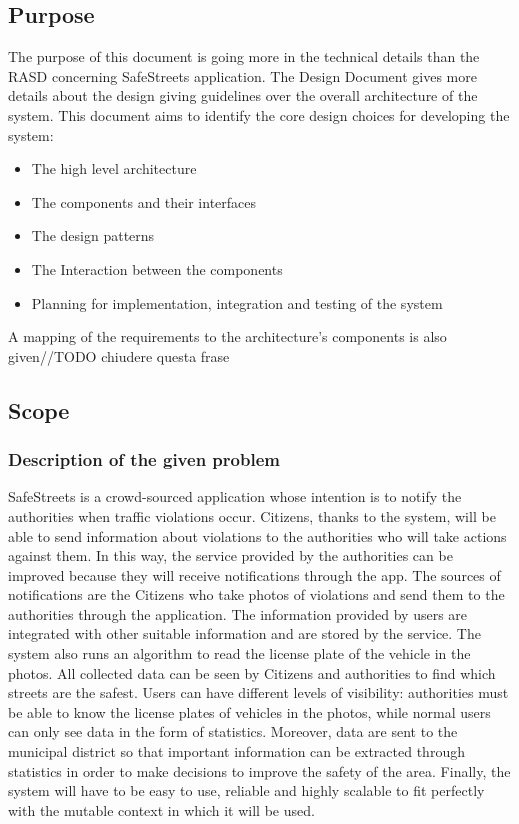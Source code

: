 
\subsection{Purpose}
The purpose of this document is going more in the technical details than the RASD concerning SafeStreets application.
\newline
The Design Document gives more details about the design giving guidelines over the overall architecture of the system.
This document  aims to identify the core design choices for developing the system:
\begin{itemize}
\item The high level architecture
\item The components and their interfaces
\item The design patterns
\item The Interaction between the components
\item Planning for implementation, integration and testing of the system
\end{itemize}
A mapping of the requirements to the architecture's components is also given//TODO chiudere questa frase 

\subsection{Scope}
\subsubsection{Description of the given problem}
SafeStreets is a crowd-sourced application whose intention is to notify the authorities when traffic
violations occur. Citizens, thanks to the system, will be able to send information about violations to the
authorities who will take actions against them. In this way, the service provided by the authorities can be
improved because they will receive notifications through the app. The sources of notifications are the
Citizens who take photos of violations and send them to the authorities through
the application. The information provided by users are integrated with other suitable information and are
stored by the service. The system also runs an algorithm to read the license plate of the vehicle in the
photos. All collected data can be seen by Citizens and authorities to find which streets are the safest.
Users can have different levels of visibility: authorities must be able to know the license plates of vehicles
in the photos, while normal users can only see data in the form of statistics. Moreover, data are sent to
the municipal district so that important information can be extracted through statistics in order to make
decisions to improve the safety of the area. Finally, the system will have to be easy to use, reliable
and highly scalable to fit perfectly with the mutable context in which it will be used.


